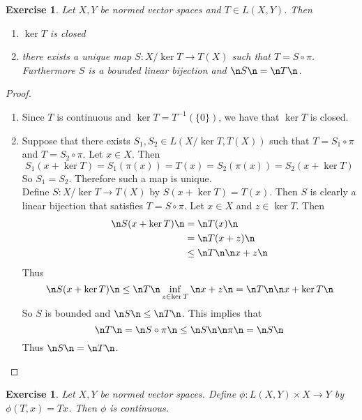 \documentclass[12pt]{amsart}
\newtheorem{ex}[thm]{Exercise}
\begin{document}
\begin{ex}
	Let $X,Y$ be normed vector spaces and $T \in L(X,Y)$. Then
	\begin{enumerate}
		\item $\ker T$ is closed
		\item there exists a unique map $S :X/ \ker T \rightarrow T(X)$ such that $T = S \circ \pi$. Furthermore $S$ is a bounded linear bijection and $\n S \n = \n T \n$.
	\end{enumerate}
\end{ex}

\begin{proof}
	\begin{enumerate}
		\item Since $T$ is continuous and $\ker T = T^{-1}(\{0\})$, we have that $\ker T$ is closed.
		\item Suppose that there exists $S_1,S_2 \in L(X/ \ker T, T(X)) $ such that $T = S_1 \circ \pi$ and  $T = S_2 \circ \pi $. Let $x \in X$. Then $$S_1(x + \ker T) = S_1(\pi(x)) = T(x) = S_2(\pi(x)) = S_2(x + \ker T)$$ So $S_1 = S_2$. Therefore such a map is unique.\\
		Define $S: X / \ker T \rightarrow T(X)$ by $S(x+ \ker T) = T(x)$. Then $S$ is clearly a linear bijection that satisfies $T = S \circ \pi$. Let $x \in X$ and $z \in \ker T$. Then 
		\begin{align*}
			\n S(x+ \ker T) \n
			& = \n T(x) \n \\
			& = \n T(x+z) \n \\
			& \leq \n T \n \n x+ z \n
		\end{align*} 
		Thus $$\n S(x+ \ker T) \n \leq \n T \n \inf_{z \in \ker T}  \n x + z \n = \n T \n \n x + \ker T \n$$
		So $S$ is bounded and $\n S \n \leq \n T \n$. This implies that $$\n T \n = \n S \circ \pi \n \leq \n S \n \n \pi \n = \n S \n$$
		Thus $\n S \n = \n T \n$.
	\end{enumerate}
\end{proof}

\begin{ex}
	Let $X, Y$ be normed vector spaces. Define $\phi: L(X,Y) \times X \rightarrow Y$ by \\$\phi(T,x) = Tx$. Then $\phi$ is continuous.
\end{ex}
\end{document}
